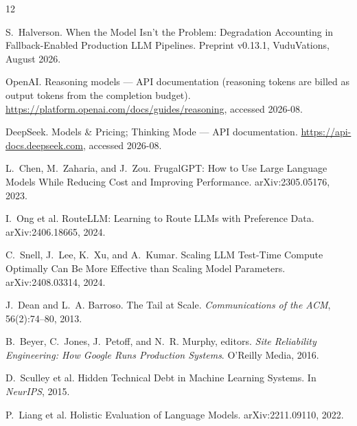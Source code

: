\documentclass[11pt]{article}
\begin{document}

\begin{thebibliography}{12}

S.~Halverson.
\newblock When the Model Isn't the Problem: Degradation Accounting in
Fallback-Enabled Production LLM Pipelines.
\newblock Preprint v0.13.1, VuduVations, August 2026.

OpenAI.
\newblock Reasoning models --- API documentation (reasoning tokens are billed as
output tokens from the completion budget).
\newblock \url{https://platform.openai.com/docs/guides/reasoning}, accessed
2026-08.

DeepSeek.
\newblock Models \& Pricing; Thinking Mode --- API documentation.
\newblock \url{https://api-docs.deepseek.com}, accessed 2026-08.

L.~Chen, M.~Zaharia, and J.~Zou.
\newblock FrugalGPT: How to Use Large Language Models While Reducing Cost and
Improving Performance.
\newblock arXiv:2305.05176, 2023.

I.~Ong et al.
\newblock RouteLLM: Learning to Route LLMs with Preference Data.
\newblock arXiv:2406.18665, 2024.

C.~Snell, J.~Lee, K.~Xu, and A.~Kumar.
\newblock Scaling LLM Test-Time Compute Optimally Can Be More Effective than
Scaling Model Parameters.
\newblock arXiv:2408.03314, 2024.

J.~Dean and L.~A. Barroso.
\newblock The Tail at Scale.
\newblock \emph{Communications of the ACM}, 56(2):74--80, 2013.

B.~Beyer, C.~Jones, J.~Petoff, and N.~R. Murphy, editors.
\newblock \emph{Site Reliability Engineering: How Google Runs Production
Systems}.
\newblock O'Reilly Media, 2016.

D.~Sculley et al.
\newblock Hidden Technical Debt in Machine Learning Systems.
\newblock In \emph{NeurIPS}, 2015.

P.~Liang et al.
\newblock Holistic Evaluation of Language Models.
\newblock arXiv:2211.09110, 2022.

\end{thebibliography}
\end{document}
